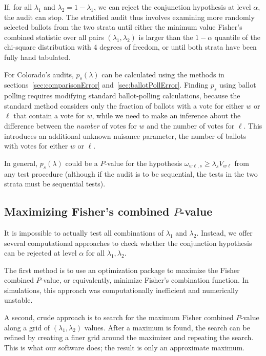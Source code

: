 \documentclass[runningheads]{llncs}
\begin{document}
If, for all $\lambda_1$ and $\lambda_2 = 1- \lambda_1$, we can reject the conjunction
hypothesis at level $\alpha$, the audit can stop.
The stratified audit thus involves examining more randomly selected ballots from the two strata until 
either the minimum value Fisher's combined statistic over all pairs $(\lambda_1, \lambda_2)$ is larger than the $1-\alpha$ quantile of the chi-square
distribution with 4 degrees of freedom, or until both strata have been fully hand tabulated.

For Colorado's audits, $p_s(\lambda)$ can be calculated using the methods in 
sections~\ref{sec:comparisonError} and~\ref{sec:ballotPollError}.
Finding $p_s$ using ballot polling requires modifying standard ballot-polling calculations,
because the standard method considers only the fraction of ballots with a vote for either 
$w$ or $\ell$ that contain a vote for $w$, while we need to make an inference about the 
difference between the \emph{number} of votes for $w$ and the number of votes for $\ell$.
This introduces an additional unknown nuisance parameter, the number of ballots with votes for either
$w$ or $\ell$.

In general, $p_s(\lambda)$ could be a $P$-value for the hypothesis
$\omega_{w\ell,s} \ge \lambda_s V_{w\ell}$ from any test procedure (although
if the audit is to be sequential, the tests in the two strata must be sequential tests). 

\subsection{Maximizing Fisher's combined $P$-value}

It is impossible to actually test all combinations of $\lambda_1$ and $\lambda_2$.
Instead, we offer several computational approaches to check whether the conjunction hypothesis can be rejected at level $\alpha$ for all $\lambda_1, \lambda_2$.

The first method is to use an optimization package to maximize the 
Fisher combined $P$-value, or equivalently,
minimize Fisher's combination function.
In simulations, this approach was computationally inefficient and numerically unstable.

A second, crude approach is to search for the maximum Fisher combined $P$-value along a grid of $(\lambda_1, \lambda_2)$ values.
After a maximum is found, the search can be refined by creating a finer grid around the maximizer and repeating the search.
This is what our software does;
 the result is only an approximate maximum. 
\end{document}
